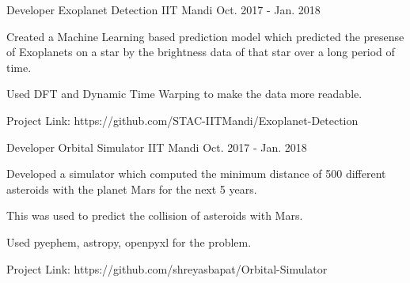 \begin{cventries}


\cventry
{Developer} %
{Exoplanet Detection} %
{IIT Mandi} %
{Oct. 2017 - Jan. 2018} %
{ %
\begin{cvitems}
\item {Created a Machine Learning based prediction model which predicted the presense of Exoplanets on a star by the brightness data of that star over a long period of time.}
\item {Used DFT and Dynamic Time Warping to make the data more readable.}
\item {Project Link: https://github.com/STAC-IITMandi/Exoplanet-Detection}
\end{cvitems}
}


\cventry
{Developer} %
{Orbital Simulator} %
{IIT Mandi} %
{Oct. 2017 - Jan. 2018} %
{ %
\begin{cvitems}
\item {Developed a simulator which computed the minimum distance of 500 different asteroids with the planet Mars for the next 5 years.}
\item {This was used to predict the collision of asteroids with Mars.}
\item {Used pyephem, astropy, openpyxl for the problem.}
\item {Project Link: https://github.com/shreyasbapat/Orbital-Simulator}
\end{cvitems}
}




\end{cventries}
